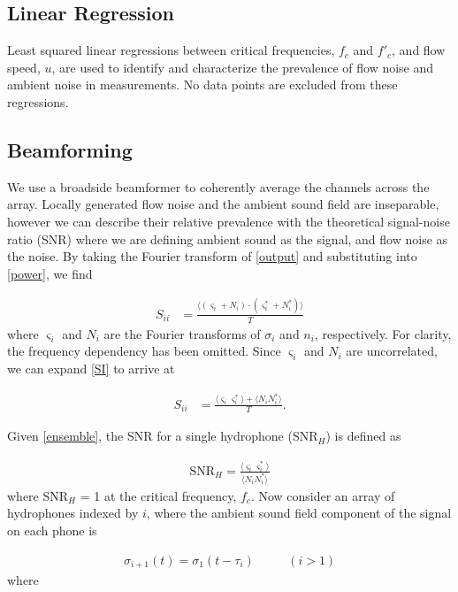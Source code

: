 \documentclass[12pt,journal,onecolumn]{IEEEtran}
\begin{document}
\subsection{Linear Regression}

Least squared linear regressions between critical frequencies,  $f_c$ and $f'_c$, and flow speed, $u$, are used to identify and characterize the prevalence of flow noise and ambient noise in measurements. No data points are excluded from these regressions.



\subsection{Beamforming }

We use a broadside beamformer to coherently average the channels across the array. Locally generated flow noise and the ambient sound field are inseparable, however we can describe their relative prevalence with the theoretical signal-noise ratio (SNR) where we are defining ambient sound as the signal, and flow noise as the noise. By taking the Fourier transform of \eqref{output} and substituting into \eqref{power}, we find

\begin{align}
S_{ii} &= \frac{\langle (\varsigma_i + N_i)\cdot(\varsigma^*_i + N^*_i) \rangle}{T}
\label{SI}
\end{align}
where $\varsigma_i$ and $N_i$ are the Fourier transforms of $\sigma_i$ and $n_i$, respectively. For clarity, the frequency dependency has been omitted. Since $\varsigma_i$ and $N_i$ are uncorrelated, we can expand \eqref{SI} to arrive at

\begin{align}
S_{ii} &= \frac{\langle \varsigma_i \varsigma^*_i \rangle + \langle N_i N^*_i \rangle}{T}.
\label{ensemble}
\end{align}

Given \eqref{ensemble}, the SNR for a single hydrophone (SNR$_H$) is defined as	

\begin{align}
\text{SNR}_H = \frac{\langle \varsigma_i \varsigma^*_i \rangle}{\langle N_i N^*_i \rangle}
\label{SNR}
\end{align}
where SNR$_H$ = 1 at the critical frequency, $f_c$. Now consider an array of hydrophones indexed by $i$, where the ambient sound field component of the signal on each phone is

\begin{align}
\sigma_{i+1}(t) = \sigma_1(t-\tau_{i}) \quad \quad \text{ } (i>1)
\label{delay}
\end{align}
where 
\end{document}
